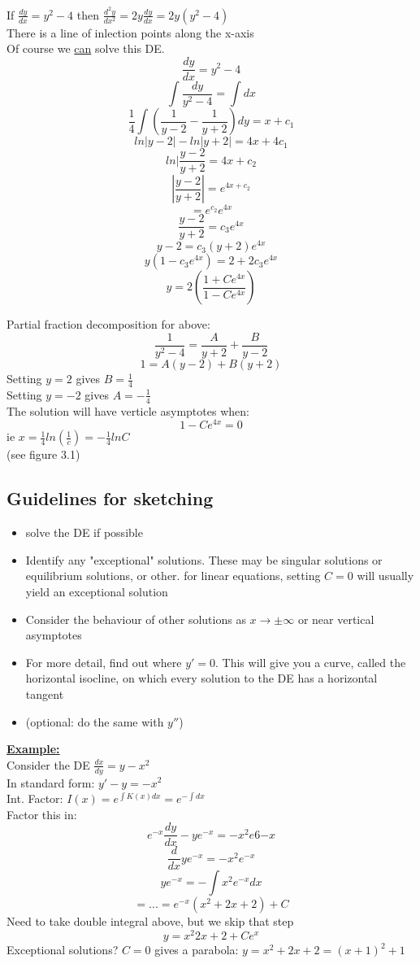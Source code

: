 \documentclass[12pt]{article}
\newcommand{\myt}[1]{\textbf{\underline{#1}}}
\begin{document}
	If $\frac{dy}{dx} = y^2 - 4$ then $\frac{d^2y}{dx^2} = 2y\frac{dy}{dx} = 2y(y^2 - 4)$\\
	There is a line of inlection points along the x-axis\\
	
	Of course we \underline{can} solve this DE.\\
	
	$$\frac{dy}{dx} = y^2 - 4$$
	$$\int \frac{dy}{y^2-4} = \int dx$$
	$$\frac{1}{4} \int (\frac{1}{y-2} - \frac{1}{y+2})dy = x + c_1$$
	$$ln|y-2| - ln|y+2| = 4x + 4c_1$$
	$$ln|\frac{y-2}{y+2} = 4x + c_2$$
	$$|\frac{y-2}{y+2}| = e^{4x+c_2}$$
	$$= e^{c_2}e^{4x}$$
	$$\frac{y-2}{y+2} = c_3e^{4x}$$
	$$y-2 = c_3(y+2)e^{4x}$$
	$$y(1-c_3e^{4x}) = 2 + 2c_3e^{4x}$$
	$$y = 2(\frac{1 + Ce^{4x}}{1-Ce^{4x}})$$
	
	Partial fraction decomposition for above:\\
	$$\frac{1}{y^2-4} = \frac{A}{y+2} + \frac{B}{y-2}$$
	$$1 = A(y-2) + B(y+2)$$
	Setting $y=2$ gives $B = \frac{1}{4}$\\
	Setting $y=-2$ gives $A = -\frac{1}{4}$\\
	
	The solution will have verticle asymptotes when:\\
	$$1-Ce^{4x} = 0$$
	ie $x = \frac{1}{4}ln(\frac{1}{c}) = -\frac{1}{4}lnC$\\
	(see figure 3.1)
	
	\subsection*{Guidelines for sketching}
	\begin{itemize}
		\item solve the DE if possible
		\item Identify any "exceptional" solutions. These may be singular solutions or equilibrium solutions, or other. for linear equations, setting $C = 0$ will usually yield an exceptional solution
		\item Consider the behaviour of other solutions as $x \rightarrow \pm \infty$ or near vertical asymptotes
		\item For more detail, find out where $y' = 0$. This will give you a curve, called the horizontal isocline, on which every solution to the DE has a horizontal tangent
		\item (optional: do the same with $y''$)
	\end{itemize}

	\myt{Example:}\\
	Consider the DE $\frac{dx}{dy} = y - x^2$\\
	In standard form: $y' - y = -x^2$\\
	Int. Factor: $I(x) = e^{\int K(x)dx} = e^{-\int dx}$\\
	Factor this in:\\
	$$e^{-x}\frac{dy}{dx} - ye^{-x} = -x^2e6{-x}$$
	$$\frac{d}{dx}ye^{-x} = -x^2e^{-x}$$
	$$ye^{-x} = -\int x^2e^{-x}dx$$
	$$= ... = e^{-x}(x^2 + 2x+2) + C$$
	Need to take double integral above, but we skip that step\\
	$$y = x^2 2x + 2 + Ce^x$$
	Exceptional solutions? $C = 0$ gives a parabola: $y = x^2 + 2x + 2 = (x+1)^2 + 1$\\
	
\end{document}
